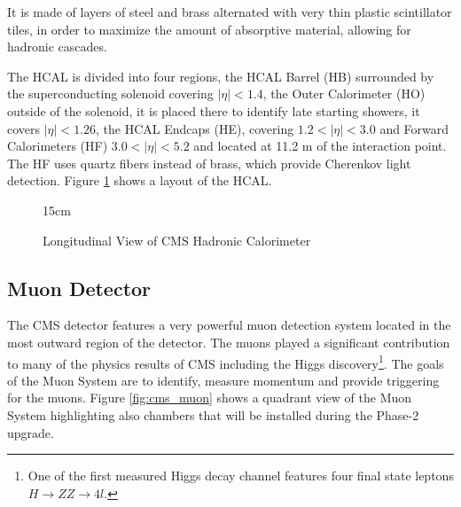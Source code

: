 It is made of layers of steel and brass alternated with very thin plastic scintillator tiles, in order to maximize the amount of absorptive material, allowing for hadronic cascades.

The HCAL is divided into four regions, the HCAL Barrel (HB) surrounded by the superconducting solenoid covering $|\eta| < 1.4$, the Outer Calorimeter (HO) outside of the solenoid, it is placed there to identify late starting showers, it covers $|\eta| < 1.26$, the HCAL Endcaps (HE), covering $1.2 < |\eta| < 3.0$ and Forward Calorimeters (HF) $3.0 < |\eta| < 5.2$ and located at 11.2 m of the interaction point. The HF uses quartz fibers instead of brass, which provide Cherenkov light detection. Figure \ref{fig:hcal_layout} shows a layout of the HCAL.

\begin{figure}[!htm]{15cm} 
\caption{Longitudinal View of CMS Hadronic Calorimeter}%
\label{fig:hcal_layout}
\end{figure}

\subsection{Muon Detector}

The CMS detector features a very powerful muon detection system located in the most outward region of the detector. The muons played a significant contribution to many of the physics results of CMS including the Higgs discovery\footnote{One of the first measured Higgs decay channel features four final state leptons $H \rightarrow ZZ \rightarrow 4 l$.}. The goals of the Muon System are to identify, measure momentum and provide triggering for the muons. Figure \ref{fig:cms_muon} shows a quadrant view of the Muon System highlighting also chambers that will be installed during the Phase-2 upgrade.

